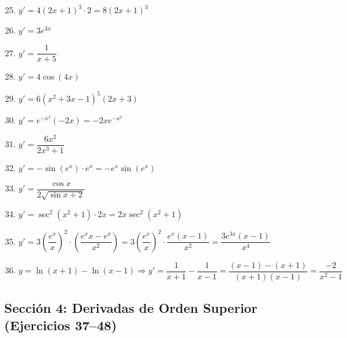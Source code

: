 \documentclass[12pt, a4paper]{article}
\begin{document}
\begin{enumerate}[leftmargin=*, label=\textbf{\arabic*.}]
  \setcounter{enumi}{24}
  \item $y' = 4(2x + 1)^3 \cdot 2 = 8(2x + 1)^3$
  \item $y' = 3e^{3x}$
  \item $y' = \dfrac{1}{x + 5}$
  \item $y' = 4\cos(4x)$
  \item $y' = 6(x^2 + 3x - 1)^5(2x + 3)$
  \item $y' = e^{-x^2}(-2x) = -2x e^{-x^2}$
  \item $y' = \dfrac{6x^2}{2x^3 + 1}$
  \item $y' = -\sin(e^x) \cdot e^x = -e^x \sin(e^x)$
  \item $y' = \dfrac{\cos x}{2\sqrt{\sin x + 2}}$
  \item $y' = \sec^2(x^2 + 1) \cdot 2x = 2x \sec^2(x^2 + 1)$
  \item $y' = 3\left(\dfrac{e^x}{x}\right)^2 \cdot \left(\dfrac{e^x x - e^x}{x^2}\right) = 3\left(\dfrac{e^x}{x}\right)^2 \cdot \dfrac{e^x(x - 1)}{x^2} = \dfrac{3e^{3x}(x - 1)}{x^4}$
  \item $y = \ln(x + 1) - \ln(x - 1) \Rightarrow y' = \dfrac{1}{x + 1} - \dfrac{1}{x - 1} = \dfrac{(x - 1) - (x + 1)}{(x + 1)(x - 1)} = \dfrac{-2}{x^2 - 1}$
\end{enumerate}

\subsection*{Sección 4: Derivadas de Orden Superior (Ejercicios 37--48)}
\end{document}
